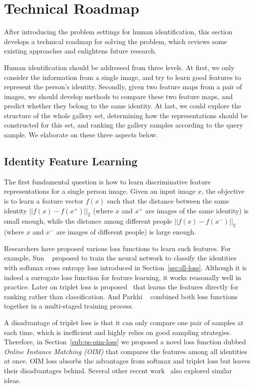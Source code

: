 \section{Technical Roadmap} %
\label{sec:human-id-tech-roadmap}
After introducing the problem settings for human identification, this section develops a technical roadmap for solving the problem, which reviews some existing approaches and enlightens future research.

Human identification should be addressed from three levels. At first, we only consider the information from a single image, and try to learn good features to represent the person's identity. Secondly, given two feature maps from a pair of images, we should develop methods to compare these two feature maps, and predict whether they belong to the same identity. At last, we could explore the structure of the whole gallery set, determining how the representations should be constructed for this set, and ranking the gallery samples according to the query sample. We elaborate on these three aspects below.

\subsection{Identity Feature Learning} %
\label{sub:human-id-feat-learn}
The first fundamental question is how to learn discriminative feature representations for a single person image. Given an input image $x$, the objective is to learn a feature vector $f(x)$ such that the distance between the same identity $||f(x)-f(x^+)||_2$ (where $x$ and $x^+$ are images of the same identity) is small enough, while the distance among different people $||f(x)-f(x^-)||_2$ (where $x$ and $x^-$ are images of different people) is large enough.

Researchers have proposed various loss functions to learn such features. For example, Sun \etal~\cite{sun2014deep1,sun2014deep2} proposed to train the neural network to classify the identities with softmax cross entropy loss introduced in Section~\ref{sec:dl-loss}. Although it is indeed a surrogate loss function for feature learning, it works reasonally well in practice. Later on triplet loss is proposed~\cite{taigman2014deepface} that learns the features directly for ranking rather than classification. And Parkhi \etal~\cite{parkhi2015deep} combined both loss functions together in a multi-staged training process.

A disadvantage of triplet loss is that it can only compare one pair of samples at each time, which is inefficient and highly relies on good sampling strategies. Therefore, in Section~\ref{sub:ps-oim-loss} we proposed a novel loss function dubbed \emph{Online Instance Matching (OIM)} that compares the features among all identities at once. OIM loss absorbs the advantages from softmax and triplet loss but leaves their disadvantages behind. Several other recent work~\cite{wen2016discriminative,titsias2016one,snell2017prototypical} also explored similar ideas.

